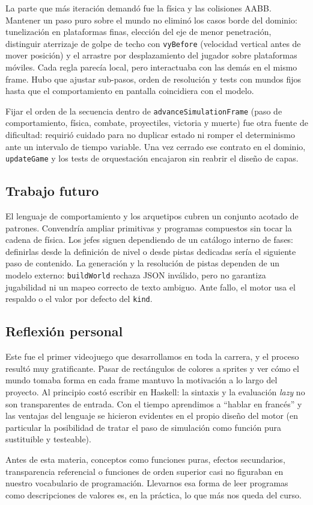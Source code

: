 La parte que más iteración demandó fue la física y las colisiones AABB. Mantener
un paso puro sobre el mundo no eliminó los casos borde del dominio:
tunelización en plataformas finas, elección del eje de menor penetración, distinguir
aterrizaje de golpe de techo con \texttt{vyBefore} (velocidad vertical antes de mover
posición) y el arrastre por desplazamiento del jugador sobre plataformas móviles.
Cada regla parecía local, pero interactuaba con las demás en el mismo
frame. Hubo que ajustar sub-pasos, orden de resolución y tests con
mundos fijos hasta que el comportamiento en pantalla coincidiera con el
modelo.

Fijar el orden de la secuencia dentro de
\texttt{advanceSimulationFrame} (paso de comportamiento, física, combate, proyectiles,
victoria y muerte) fue otra fuente de dificultad: requirió cuidado para no duplicar
estado ni romper el determinismo ante un intervalo de tiempo variable. Una vez cerrado ese contrato en
el dominio, \texttt{updateGame} y los tests de orquestación encajaron sin
reabrir el diseño de capas.

\subsection{Trabajo futuro}
\label{subsec:conclusiones-futuro}

El lenguaje de comportamiento y los arquetipos cubren un conjunto acotado de patrones. Convendría
ampliar primitivas y programas compuestos sin tocar la cadena de física. Los
jefes siguen dependiendo de un catálogo interno de fases: definirlas desde la
definición de nivel o desde pistas dedicadas sería el siguiente paso de
contenido. La generación y la resolución de pistas dependen de un modelo externo:
\texttt{buildWorld} rechaza JSON inválido, pero no garantiza jugabilidad ni un mapeo
correcto de texto ambiguo. Ante fallo, el motor usa el respaldo o el
valor por defecto del \texttt{kind}.

\subsection{Reflexión personal}
\label{subsec:conclusiones-reflexion}

Este fue el primer videojuego que desarrollamos en toda la carrera, y el proceso
resultó muy gratificante. Pasar de rectángulos de colores a sprites y ver cómo el
mundo tomaba forma en cada frame mantuvo la motivación a lo largo
del proyecto. Al principio costó escribir en Haskell: la sintaxis y la
evaluación \textit{lazy} no son transparentes de entrada. Con el tiempo aprendimos a 
``hablar en francés'' y las ventajas del lenguaje
se hicieron evidentes en el propio diseño del motor (en particular la posibilidad
de tratar el paso de simulación como función pura sustituible y testeable).

Antes de esta materia, conceptos como funciones puras, efectos secundarios, transparencia
referencial o funciones de orden superior casi no figuraban en nuestro vocabulario
de programación. Llevarnos esa forma de leer programas como descripciones de valores
es, en la práctica, lo que más nos queda del curso.
